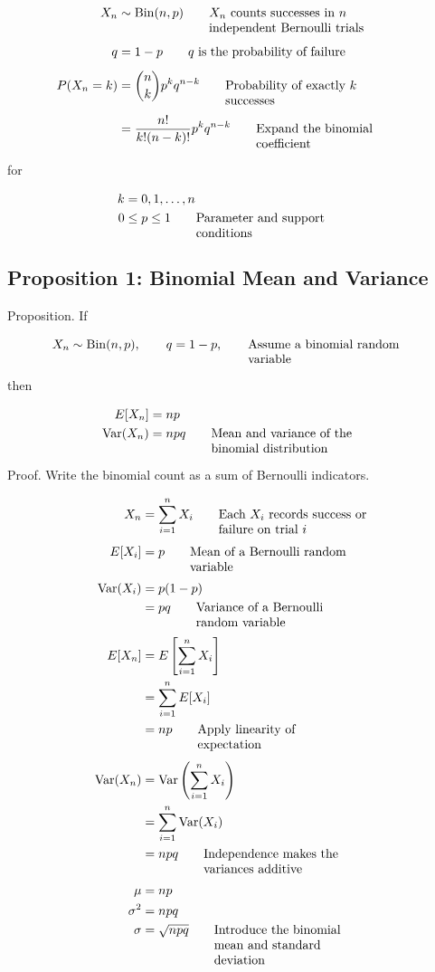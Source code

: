 \documentclass{article}
\newcommand{\justwidth}{0.36\textwidth}
\newcommand{\just}[1]{\parbox[t]{\justwidth}{\raggedright #1}}
\begin{document}
\begin{align*}
X_n
&\sim
\operatorname{Bin}(n,p)
\tag*{\just{$X_n$ counts successes in $n$ independent Bernoulli trials}}
\\[0.45em]
q
&=
1-p
\tag*{\just{$q$ is the probability of failure}}
\\[0.45em]
P(X_n=k)
&=
\binom{n}{k}
p^kq^{n-k}
\tag*{\just{Probability of exactly $k$ successes}}
\\[0.45em]
&=
\frac{n!}{k!(n-k)!}
p^kq^{n-k}
\tag*{\just{Expand the binomial coefficient}}
\end{align*}

for

\begin{align*}
k
&=
0,1,\ldots,n
\\
0
&\leq
p
\leq
1
\tag*{\just{Parameter and support conditions}}
\end{align*}

\subsection{Proposition 1: Binomial Mean and Variance}
Proposition. If

\begin{align*}
X_n
&\sim
\operatorname{Bin}(n,p),
\qquad
q=1-p,
\tag*{\just{Assume a binomial random variable}}
\end{align*}

then

\begin{align*}
E[X_n]
&=
np
\\
\operatorname{Var}(X_n)
&=
npq
\tag*{\just{Mean and variance of the binomial distribution}}
\end{align*}

Proof. Write the binomial count as a sum of Bernoulli indicators.

\begin{align*}
X_n
&=
\sum_{i=1}^{n}X_i
\tag*{\just{Each $X_i$ records success or failure on trial $i$}}
\\[0.45em]
E[X_i]
&=
p
\tag*{\just{Mean of a Bernoulli random variable}}
\\[0.45em]
\operatorname{Var}(X_i)
&=
p(1-p)
\\
&=
pq
\tag*{\just{Variance of a Bernoulli random variable}}
\\[0.45em]
E[X_n]
&=
E\left[
\sum_{i=1}^{n}X_i
\right]
\\
&=
\sum_{i=1}^{n}
E[X_i]
\\
&=
np
\tag*{\just{Apply linearity of expectation}}
\\[0.45em]
\operatorname{Var}(X_n)
&=
\operatorname{Var}
\left(
\sum_{i=1}^{n}X_i
\right)
\\
&=
\sum_{i=1}^{n}
\operatorname{Var}(X_i)
\\
&=
npq
\tag*{\just{Independence makes the variances additive}}
\\[0.45em]
\mu
&=
np
\\
\sigma^2
&=
npq
\\
\sigma
&=
\sqrt{npq}
\tag*{\just{Introduce the binomial mean and standard deviation}}
\end{align*}
\end{document}
